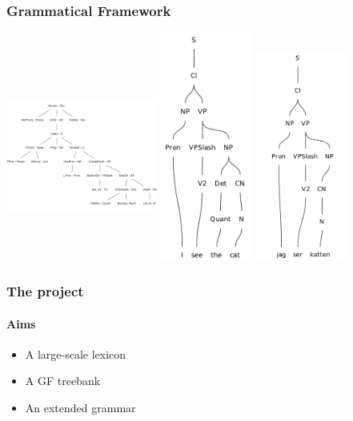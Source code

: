 \documentclass[10pt]{beamer}
\begin{document}
\begin{frame}
  \frametitle{Grammatical Framework}
\includegraphics[width=50mm,height=70mm]{gfTree.png}
\includegraphics[width=30mm]{gfETree.png}
\includegraphics[width=30mm]{gfSTree.png}
 \end{frame}


\begin{frame}
\frametitle{The project}
\framesubtitle{Aims} 
\begin{itemize}
\item{A large-scale lexicon}
\item{A GF treebank}
\item{An extended grammar}
\end{itemize}
\end{frame}
\end{document}

